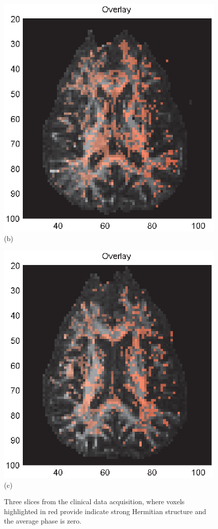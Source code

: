 \documentclass[authoryear,preprint,12pt]{elsarticle}
\begin{document}
\begin{figure}[tbp]
\begin{center}
\begin{minipage}[]{.32\textwidth}
      \includegraphics[width=\textwidth]{overlaynew55b.eps}
      (b)
    \end{minipage}
    \begin{minipage}[]{.32\textwidth}
      \centering
      \includegraphics[width=\textwidth]{overlaynew55ny.eps}
      (c)
    \end{minipage}
  \end{center}
  \caption{Three slices from the clinical data acquisition, where
    voxels highlighted in red provide indicate strong Hermitian
    structure and the average phase is zero.}
  \label{fig3b} 
\end{figure}
\end{document}
